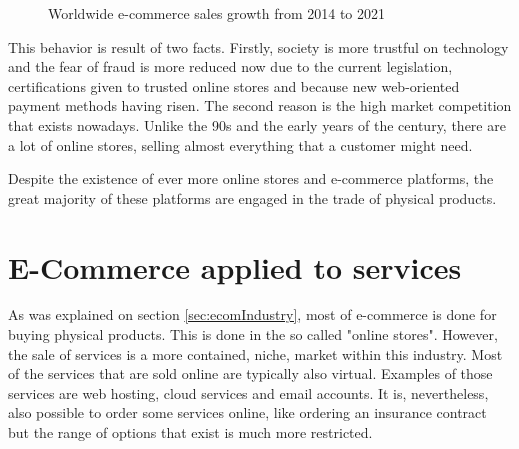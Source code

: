\begin{figure}[ht]
\centering
\caption{Worldwide e-commerce sales growth from 2014 to 2021}
\label{fig:ecommerceGrowth}
\end{figure}

This behavior is result of two facts. Firstly, society is more trustful on technology and the fear of fraud is more reduced now due to the current legislation, certifications given to trusted online stores and because new web-oriented payment methods having risen. The second reason is the high market competition that exists nowadays. Unlike the 90s and the early years of the  century, there are a lot of online stores, selling almost everything that a customer might need.
\par

Despite the existence of ever more online stores and e-commerce platforms, the great majority of these platforms are engaged in the trade of physical products.

\section{E-Commerce applied to services}
\label{sec:ecommerceAppliedToServices}
As was explained on section \ref{sec:ecomIndustry}, most of e-commerce is done for buying physical products. This is done in the so called "online stores". However, the sale of services is a more contained, niche, market within this industry. Most of the services that are sold online are typically also virtual. Examples of those services are web hosting, cloud services and email accounts. It is, nevertheless, also possible to order some services online, like ordering an insurance contract but the range of options that exist is much more restricted.